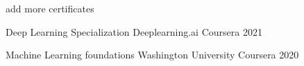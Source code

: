 

\begin{cvhonors}

    

   add more certificates

            \cvhonor
        {Deep Learning Specialization} %
        {Deeplearning.ai Coursera} %
    {} %
    {2021} %
%     
    
     \cvhonor
        {Machine Learning foundations} %
  {Washington University Coursera} %
    {} %
    {2020} %
  

\end{cvhonors}

